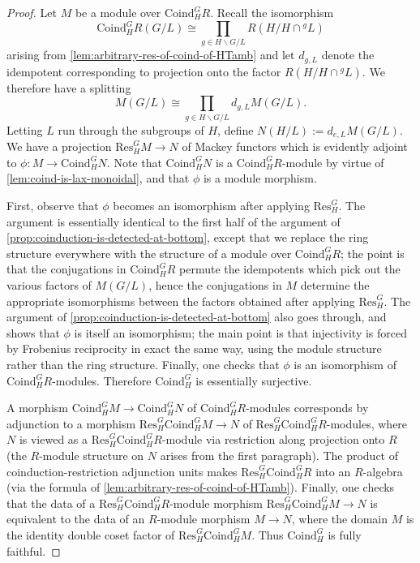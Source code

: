 \documentclass[11pt,dvipsnames]{amsart}
\theoremstyle{BoldRemark}
\begin{document}
\begin{proof}
	Let $M$ be a module over $\mathrm{Coind}_H^G R$. Recall the isomorphism \[ \mathrm{Coind}_H^G R(G/L) \cong \prod_{g \in H \backslash G / L} R(H/H \cap {}^g L) \] arising from \cref{lem:arbitrary-res-of-coind-of-HTamb} and let $d_{g,L}$ denote the idempotent corresponding to projection onto the factor $R(H/H \cap {}^g L)$. We therefore have a splitting \[ M(G/L) \cong \prod_{g \in H \backslash G / L} d_{g,L} M(G/L) . \] Letting $L$ run through the subgroups of $H$, define $N(H/L) := d_{e,L} M(G/L)$. We have a projection $\mathrm{Res}_H^G M \rightarrow N$ of Mackey functors which is evidently adjoint to $\phi : M \rightarrow \mathrm{Coind}_H^G N$. Note that $\mathrm{Coind}_H^G N$ is a $\mathrm{Coind}_H^G R$-module by virtue of \cref{lem:coind-is-lax-monoidal}, and that $\phi$ is a module morphism.
	
	First, observe that $\phi$ becomes an isomorphism after applying $\mathrm{Res}_H^G$. The argument is essentially identical to the first half of the argument of \cref{prop:coinduction-is-detected-at-bottom}, except that we replace the ring structure everywhere with the structure of a module over $\mathrm{Coind}_H^G R$; the point is that the conjugations in $\mathrm{Coind}_H^G R$ permute the idempotents which pick out the various factors of $M(G/L)$, hence the conjugations in $M$ determine the appropriate isomorphisms between the factors obtained after applying $\mathrm{Res}_H^G$. The argument of \cref{prop:coinduction-is-detected-at-bottom} also goes through, and shows that $\phi$ is itself an isomorphism; the main point is that injectivity is forced by Frobenius reciprocity in exact the same way, using the module structure rather than the ring structure. Finally, one checks that $\phi$ is an isomorphism of $\mathrm{Coind}_H^G R$-modules. Therefore $\mathrm{Coind}_H^G$ is essentially surjective.
	
	A morphism $\mathrm{Coind}_H^G M \rightarrow \mathrm{Coind}_H^G N$ of $\mathrm{Coind}_H^G R$-modules corresponds by adjunction to a morphism $\mathrm{Res}_H^G \mathrm{Coind}_H^G M \rightarrow N$ of $\mathrm{Res}_H^G \mathrm{Coind}_H^G R$-modules, where $N$ is viewed as a $\mathrm{Res}_H^G \mathrm{Coind}_H^G R$-module via restriction along projection onto $R$ (the $R$-module structure on $N$ arises from the first paragraph). The product of coinduction-restriction adjunction units makes $\mathrm{Res}_H^G \mathrm{Coind}_H^G R$ into an $R$-algebra (via the formula of \cref{lem:arbitrary-res-of-coind-of-HTamb}). Finally, one checks that the data of a $\mathrm{Res}_H^G \mathrm{Coind}_H^G R$-module morphism $\mathrm{Res}_H^G \mathrm{Coind}_H^G M \rightarrow N$ is equivalent to the data of an $R$-module morphism $M \rightarrow N$, where the domain $M$ is the identity double coset factor of $\mathrm{Res}_H^G \mathrm{Coind}_H^G M$. Thus $\mathrm{Coind}_H^G$ is fully faithful.
	

\end{proof}
\end{document}
